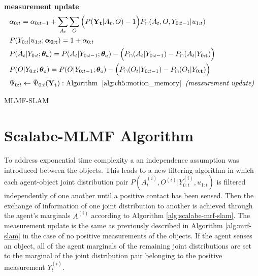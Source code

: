 \begin{appendices}
\begin{center}
\begin{minipage}{\linewidth}
\begin{algorithm}[H]
\BlankLine
\nonl\hrulefill	\\
\nonl\textbf{measurement update}
\nonl\begin{align}
 &\alpha_{0:t}       = \alpha_{0:t-1} + \sum\limits_{A_t}\sum\limits_{O} \Big(P(\mathbf{Y_t}|A_t,O) - 1\Big)P_{\cap}(A_t,O,Y_{0:t-1}|u_{1:t}) \nonumber \\
 &P(Y_{0:t}|u_{1:t};\boldsymbol{\alpha}_{\mathbf{0:t}}) = 1 + \alpha_{0:t} \nonumber\\
 &P(A_t|Y_{0:t};\boldsymbol{\theta}_a)     = P(A_t|Y_{0:t-1};\boldsymbol{\theta}_a) - \Big(P_{\cap}(A_t|Y_{0:t-1}) -  P_{\cap}(A_t|Y_{0:\mathbf{t}}) \Big) \nonumber \\
 &P(O|Y_{0:t};\boldsymbol{\theta}_o)       = P(O|Y_{0:t-1};\boldsymbol{\theta}_o) -  \Big(  P_{\cap}(O_t|Y_{0:t-1}) -  P_{\cap}(O_t|Y_{0:\mathbf{t}})\Big) \nonumber \\    
 &\Psi_{0:t} \gets \bar{\Psi}_{0:t}(\mathbf{Y_t}): \mathrm{Algorithm\;\; \ref{alg:ch5:motion_memory}\;\; \textit{(measurement update)}} \nonumber
 \end{align}
\caption{MLMF-SLAM}
\end{algorithm} 
\end{minipage}
\end{center}


\section{Scalabe-MLMF Algorithm}\label{app:scalable-mlmf}

To address exponential time complexity a an independence assumption was introduced between the objects. This leads to a new filtering algorithm in 
which each agent-object joint distribution pair $P(A^{(i)}_t,O^{(i)}|Y^{(i)}_{0:t},u_{1:t})$ is filtered independently of one another until 
a positive contact has been sensed. Then the exchange of information of one joint distribution to another is achieved through the agent's marginals $A^{(i)}$ according to Algorithm \ref{alg:scalabe-mrf-slam}.
The measurement update is the same as previously described in Algorithm \ref{alg:mrf-slam} in the case of no positive measurements of the objects. If the agent
senses an object, all of the agent marginals of the remaining joint distributions are set to the marginal of the joint distribution pair belonging to the positive 
measurement $Y^{(i)}_t$. 

\begin{center}
\begin{minipage}{\linewidth}

\begin{algorithm}[H]
\label{alg:scalabe-mrf-slam}
\BlankLine


\end{algorithm}
\end{minipage}
\end{center}
\end{appendices}
